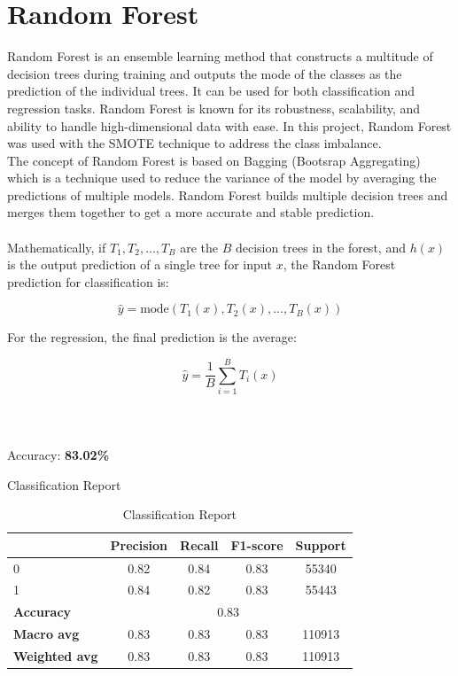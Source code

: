 \section{Random Forest}
Random Forest is an ensemble learning method that constructs a multitude of decision trees during
training and outputs the mode of the classes as the prediction of the individual trees. It can be used for both classification and regression
tasks. Random Forest
is known for its robustness, scalability, and ability to handle high-dimensional data with ease.
In this project, Random Forest was used with the SMOTE technique to address the class imbalance. \\
The concept of Random Forest is based on Bagging (Bootsrap Aggregating) which is a technique used to reduce the variance of the model
by averaging the predictions of multiple models. Random Forest builds multiple decision trees and merges them together to get a more
accurate and stable prediction.
\\
\\
Mathematically, if \( T_1, T_2, \dots, T_B \) are the \( B \) decision trees in the forest, and \( h(x) \) is the output prediction of a single tree for input \( x \), the Random Forest prediction for classification is:

\[
\hat{y} = \text{mode} \left( T_1(x), T_2(x), \dots, T_B(x) \right)
\]

For the regression, the final prediction is the average:

\[
\hat{y} = \frac{1}{B} \sum_{i=1}^{B} T_i(x)
\]
\\
\\
\\
Accuracy: \textbf{83.02\%}

\newpage
Classification Report
\begin{table}[h]
    \centering
    \begin{tabular}{lcccc}
        \toprule
        & \textbf{Precision} & \textbf{Recall} & \textbf{F1-score} & \textbf{Support} \\
        \midrule
        0 & 0.82 & 0.84 & 0.83 & 55340 \\
        1 & 0.84 & 0.82 & 0.83 & 55443 \\
        \midrule
        \textbf{Accuracy} & \multicolumn{4}{c}{0.83} \\
        \textbf{Macro avg} & 0.83 & 0.83 & 0.83& 110913 \\
        \textbf{Weighted avg} & 0.83 & 0.83 & 0.83 & 110913 \\
        \bottomrule
    \end{tabular}
    \caption{Classification Report}
    \label{tab:classification_report}
\end{table}

